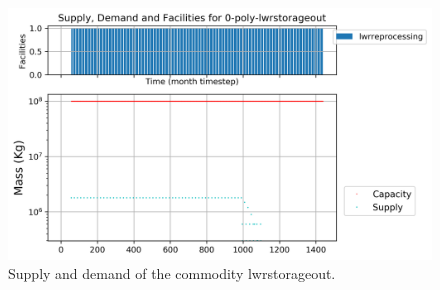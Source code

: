 \documentclass[11pt]{article}
\begin{document}
\begin{figure}[H]
	\centering
	\includegraphics[width=\textwidth]{29-figures/0-poly-lwrstorageout.png} 
	\hfill
	\caption{Supply and demand of the commodity lwrstorageout.}
	\label{fig:29-storageout1}
\end{figure}
\end{document}
